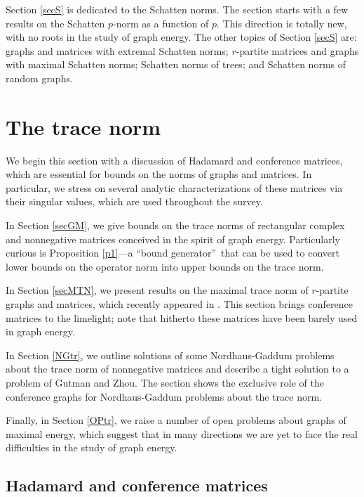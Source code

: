 \documentclass[12pt]{article}%
\begin{document}
Section \ref{secS} is dedicated to the Schatten norms. The section starts with
a few results on the Schatten $p$-norm as a function of $p.$ This direction is
totally new, with no roots in the study of graph energy. The other topics of
Section \ref{secS} are: graphs and matrices with extremal Schatten norms;
$r$-partite matrices and graphs with maximal Schatten norms;  Schatten norms
of trees; and Schatten norms of random graphs.

\section{\label{secT}The trace norm}

We begin this section with a discussion of Hadamard and conference matrices,
which are essential for bounds on the norms of graphs and matrices. In
particular, we stress on several analytic characterizations of these matrices
via their singular values, which are used throughout the survey.\medskip

In Section \ref{secGM}, we give bounds on the trace norms of rectangular
complex and nonnegative matrices conceived in the spirit of graph energy.
Particularly curious is Proposition \ref{p1}---a \textquotedblleft bound
generator\textquotedblright\ that can be used to convert lower bounds on the
operator norm into upper bounds on the trace norm.\medskip

In Section \ref{secMTN}, we present results on the maximal trace norm of
$r$-partite graphs and matrices, which recently appeared in \cite{Nik15a}.
This section brings conference matrices to the limelight; note that hitherto
these matrices have been barely used in graph energy.\medskip

In Section \ref{NGtr}, we outline solutions of some Nordhaus-Gaddum problems
about the trace norm of nonnegative matrices and describe a tight solution to
a problem of Gutman and Zhou. The section shows the exclusive role of the
conference graphs for Nordhaus-Gaddum problems about the trace norm.\medskip

Finally, in Section \ref{OPtr}, we raise a number of open problems about
graphs of maximal energy, which suggest that in many directions we are yet to
face the real difficulties in the study of graph energy.

\subsection{Hadamard and conference matrices}
\end{document}
